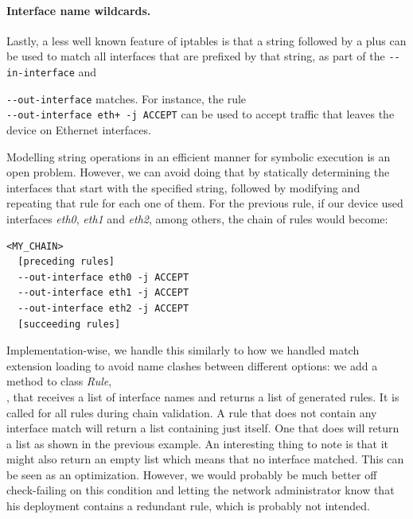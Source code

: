 \paragraph{Interface name wildcards.}
Lastly, a less well known feature of iptables is that a string followed by a
plus can be used to match all interfaces that are prefixed by that string, as
part of the \lstinline{--in-interface} and {\lstinline{--out-interface}
matches.  For instance, the rule\\
\lstinline{--out-interface eth+ -j ACCEPT} can be used to accept traffic that
leaves the device on Ethernet interfaces.

Modelling string operations in an efficient manner for symbolic execution is an
open problem.  However, we can avoid doing that by statically determining the
interfaces that start with the specified string, followed by modifying and
repeating that rule for each one of them.  For the previous rule, if our device
used interfaces \emph{eth0}, \emph{eth1} and \emph{eth2}, among others, the
chain of rules would become:

\begin{listing}
  \lstset{numbers=none, frame=single, basicstyle=\ttfamily,
    xleftmargin=0.25\textwidth, xrightmargin=0.25\textwidth
  }
  \small
  \begin{lstlisting}
<MY_CHAIN>
  [preceding rules]
  --out-interface eth0 -j ACCEPT
  --out-interface eth1 -j ACCEPT
  --out-interface eth2 -j ACCEPT
  [succeeding rules]
  \end{lstlisting}
\end{listing}

Implementation-wise, we handle this similarly to how we handled match extension
loading to avoid name clashes between different options: we add a method to
class \emph{Rule},\\ ,
that receives a list of interface names and returns a list of generated rules.
It is called for all rules during chain validation.  A rule that does not
contain any interface match will return a list containing just itself.  One
that does will return a list as shown in the previous example.  An interesting
thing to note is that it might also return an empty list which means that no
interface matched.  This can be seen as an optimization.  However, we would
probably be much better off check-failing on this condition and letting the
network administrator know that his deployment contains a redundant rule, which
is probably not intended.


}
